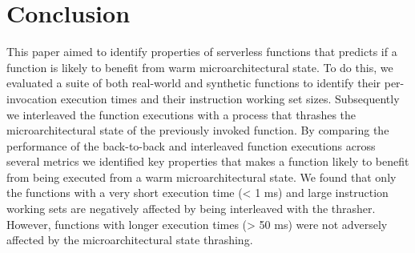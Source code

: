 \section{Conclusion}
\label{sec:conclusion}

This paper aimed to identify properties of serverless functions that predicts if a function is likely to benefit from warm microarchitectural state. To do this, we evaluated a suite of both real-world and synthetic functions to identify their per-invocation execution times and their instruction working set sizes. Subsequently we interleaved the function executions with a process that thrashes the microarchitectural state of the previously invoked function. By comparing the performance of the back-to-back and interleaved function executions across several metrics we identified key properties that makes a function likely to benefit from being executed from a warm microarchitectural state. We found that only the functions with a very short execution time (< 1 ms) and large instruction working sets are negatively affected by being interleaved with the thrasher. However, functions with longer execution times (> 50 ms) were not adversely affected by the microarchitectural state thrashing.



